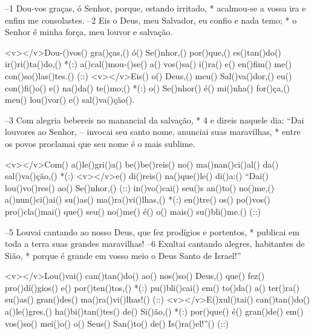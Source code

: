 –1 Dou-vos graças, ó Senhor, porque, estando irritado, *
acalmou-se a vossa ira e enfim me consolastes.
–2 Eis o Deus, meu Salvador, eu confio e nada temo; *
o Senhor é minha força, meu louvor e salvação.

<v></v>Dou-()vos() gra()ças,() ó() Se()nhor,() por()que,() es()tan()do() ir()ri()ta()do,() *(:)
a()cal()mou-()se() a() vos()sa() i()ra() e() en()fim() me() con()so()las()tes.() (::)
<v></v>Eis() o() Deus,() meu() Sal()va()dor,() eu() con()fi()o() e() na()da() te()mo;() *(:)
o() Se()nhor() é() mi()nha() for()ça,() meu() lou()vor() e() sal()va()ção().

–3 Com alegria bebereis no manancial da salvação, *
4 e direis naquele dia: “Dai louvores ao Senhor,
– invocai seu santo nome, anunciai suas maravilhas, *
entre os povos proclamai que seu nome é o mais sublime.

<v></v>Com() a()le()gri()a() be()be()reis() no() ma()nan()ci()al() da() sal()va()ção,() *(:)
<v></v>e() di()reis() na()que()le() di()a:() ``Dai() lou()vo()res() ao() Se()nhor,() (::)
in()vo()cai() seu()s an()to() no()me,() a()nun()ci()ai() su()as() ma()ra()vi()lhas,() *(:)
en()tre() os() po()vos() pro()cla()mai() que() seu() no()me() é() o() mais() su()bli()me.() (::)

–5 Louvai cantando ao nosso Deus, que fez prodígios e portentos, *
publicai em toda a terra suas grandes maravilhas!
–6 Exultai cantando alegres, habitantes de Sião, *
porque é grande em vosso meio o Deus Santo de Israel!”

<v></v>Lou()vai() can()tan()do() ao() nos()so() Deus,() que() fez() pro()dí()gios() e() por()ten()tos,() *(:)
pu()bli()cai() em() to()da() a() ter()ra() su()as() gran()des() ma()ra()vi()lhas!() (::)
<v></v>E()xul()tai() can()tan()do() a()le()gres,() ha()bi()tan()tes() de() Si()ão,() *(:)
por()que() é() gran()de() em() vos()so() mei()o() o() Seus() San()to() de() Is()ra()el!''() (::)